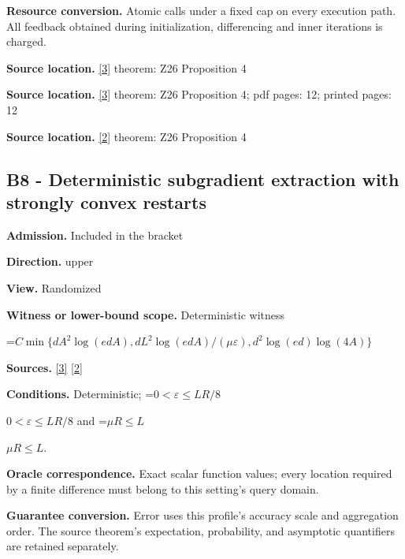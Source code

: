 \documentclass[10pt,a4paper]{article}
\newcommand{\AtlasMath}[1]{\par\begingroup\centering\setbox0=\hbox{$\displaystyle #1$}\ifdim\wd0>1.4\linewidth\typeout{ATLAS WIDE FORMULA: \the\wd0}\fi\ifdim\wd0>\linewidth\resizebox{\linewidth}{!}{\box0}\else\box0\fi\par\endgroup}
\newcommand{\AtlasInlineMath}[1]{\begingroup\setbox0=\hbox{$#1$}\ifdim\wd0>.4\linewidth\endgroup\AtlasMath{#1}\else\endgroup$#1$\fi}
\begin{document}
\textbf{Resource conversion.} Atomic calls under a fixed cap on every execution path. All feedback obtained during initialization, differencing and inner iterations is charged.



\textbf{Source location.} \href{https://arxiv.org/html/2607.16558v2}{[3]} theorem: Z26 Proposition 4



\textbf{Source location.} \href{https://arxiv.org/html/2607.16558v2}{[3]} theorem: Z26 Proposition 4; pdf pages: 12; printed pages: 12



\textbf{Source location.} \href{https://www.mathnet.ru/php/archive.phtml?jrnid=mzm&option_lang=eng&paperid=1697&wshow=paper}{[2]} theorem: Z26 Proposition 4



\subsection{B8 - Deterministic subgradient extraction with strongly convex restarts}


\textbf{Admission.} Included in the bracket



\textbf{Direction.} upper



\textbf{View.} Randomized



\textbf{Witness or lower-bound scope.} Deterministic witness



\AtlasMath{C\min\{dA^2\log(edA),dL^2\log(edA)/(\mu\varepsilon),d^2\log(ed)\log(4A)\}}


\textbf{Sources.} \href{https://arxiv.org/html/2607.16558v2}{[3]} \href{https://www.mathnet.ru/php/archive.phtml?jrnid=mzm&option_lang=eng&paperid=1697&wshow=paper}{[2]}



\textbf{Conditions.} Deterministic; \AtlasInlineMath{0<\varepsilon\le LR/8} and \AtlasInlineMath{\mu R\le L}.



\textbf{Oracle correspondence.} Exact scalar function values; every location required by a finite difference must belong to this setting's query domain.



\textbf{Guarantee conversion.} Error uses this profile's accuracy scale and aggregation order. The source theorem's expectation, probability, and asymptotic quantifiers are retained separately.
\end{document}
